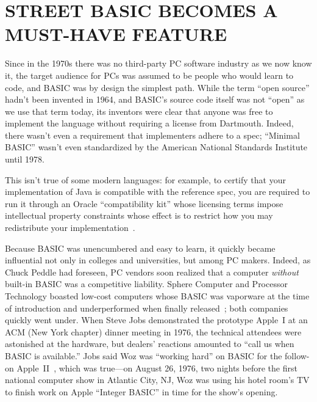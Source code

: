 
\section{STREET BASIC BECOMES A MUST-HAVE FEATURE}


Since in the 1970s there was no third-party PC software industry as we
now know it, the target audience for PCs was assumed to be people who
would learn to code, and BASIC was by design the simplest path.
While the term ``open source'' hadn't been invented in 1964, and BASIC's
source code itself was not ``open'' as we use that term today, its
inventors were clear that anyone was free to implement the language
without requiring a license from Dartmouth.
Indeed, there wasn't even a requirement that implementers adhere to a
spec; ``Minimal BASIC'' wasn't even standardized by the American
National Standards Institute until 1978.

\begin{tangent}{}
This isn't true of some modern languages: for example, to certify that
your implementation of Java is compatible with the reference spec, you
are required to run it through an Oracle ``compatibility kit'' whose
licensing terms impose intellectual property constraints whose effect is
to restrict how you may redistribute your
implementation~\cite{apache-java-letter,apache-resigns-jcp}.
\end{tangent}

Because BASIC was unencumbered and easy to learn, it quickly became
influential not only in colleges 
and universities, but among PC makers. 
Indeed, as Chuck Peddle had foreseen, PC vendors soon realized that a
computer \emph{without} 
built-in BASIC was a competitive liability.
Sphere Computer and Processor Technology boasted low-cost computers
whose BASIC was vaporware at the time of introduction and underperformed
when finally released~\cite[p. 114, 134]{veit}; both companies quickly
went under.
When Steve Jobs demonstrated the prototype Apple~I at an ACM (New York
chapter) dinner meeting in 1976, the technical attendees were astonished at the
hardware, but dealers' reactions amounted to ``call us when BASIC is
available.''
Jobs said Woz was ``working hard'' on BASIC for the follow-on
Apple~II~\cite[pp. 92ff]{veit}, which 
was true---on August 26, 1976, two nights before the first national computer show in
Atlantic City, NJ, Woz was using his hotel room's TV to finish work on
Apple ``Integer BASIC'' in time for the show's opening.

